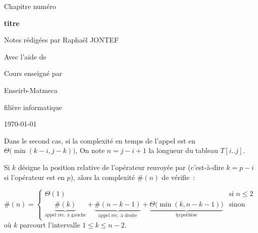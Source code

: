 

\newcommand{\titrechapitre}{titre}
\newcommand{\numerochapitre}{numéro}

\renewcommand{\headrulewidth}{0.4pt}
\renewcommand{\footrulewidth}{0.4pt}
\fancyfoot[C]{\thepage}
\fancyhead[R]{\titrechapitre}




\setlength{\headheight}{15pt}
\begin{titlepage}
    \centering
    \vspace*{3cm}
    {\huge Chapitre \numerochapitre\par}
    {\Huge \bfseries\titrechapitre\par}
    \vspace{2cm}
    {\Large Notes rédigées par Raphaël JONTEF\par}
{\Large Avec l'aide de \par}
    \vspace{0.5cm}
    {\normalsize Cours enseigné par \par}
    \vspace{4cm}
    {\small Enseirb-Matmeca\par}
    {\small filière informatique\par}
    \vfill
    {\large \today\par}
\end{titlepage}

\tableofcontents
\newpage



Dans le second cas, si la complexité en temps de l'appel  est en $\Theta\big(\min(k-i,j-k)\big)$, On note $n = j - i + 1$ la longueur du tableau $T[i..j]$.

Si $k$ désigne la position relative de l’opérateur renvoyée par 
 (c’est-à-dire $k = p-i$ si l’opérateur est en $p$), 
alors la complexité $\#(n)$ de  vérifie~:

\[
\#(n)=
\begin{cases}
\Theta(1) & \text{si } n \leq 2\\
\underbrace{\#(k)}_{\text{appel réc. à gauche}} + \underbrace{\#(n-k-1)}_{\text{appel réc. à droite}} + \underbrace{\Theta\bigl(\min(k, n-k-1)\bigr)}_{\text{hypothèse}}
& \text{sinon}
\end{cases}
\]
où $k$ parcourt l’intervalle $1 \le k \le n-2$.

